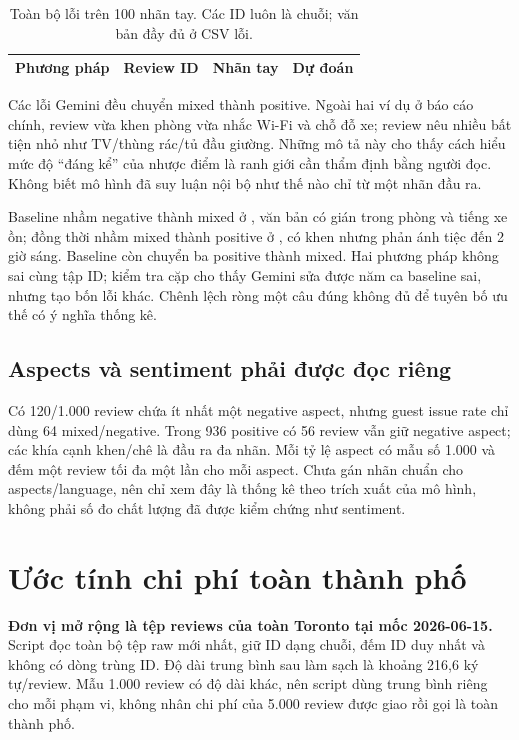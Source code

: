 \documentclass[11pt,a4paper]{article}
\begin{document}
\begin{table}[htbp]\centering\small
\caption{Toàn bộ lỗi trên 100 nhãn tay. Các ID luôn là chuỗi; văn bản đầy đủ ở CSV lỗi.}
\begin{tabular}{@{}lp{4.7cm}ll@{}}\toprule
Phương pháp & Review ID & Nhãn tay & Dự đoán\\\midrule

\end{tabular}
\end{table}

\begin{sloppypar}
Các lỗi Gemini đều chuyển mixed thành positive. Ngoài hai ví dụ ở báo cáo chính, review  vừa khen phòng vừa nhắc Wi-Fi và chỗ đỗ xe; review  nêu nhiều bất tiện nhỏ như TV/thùng rác/tủ đầu giường. Những mô tả này cho thấy cách hiểu mức độ ``đáng kể'' của nhược điểm là ranh giới cần thẩm định bằng người đọc. Không biết mô hình đã suy luận nội bộ như thế nào chỉ từ một nhãn đầu ra.
\end{sloppypar}

Baseline nhầm negative thành mixed ở , văn bản có gián trong phòng và tiếng xe ồn; đồng thời nhầm mixed thành positive ở , có khen nhưng phản ánh tiệc đến 2 giờ sáng. Baseline còn chuyển ba positive thành mixed. Hai phương pháp không sai cùng tập ID; kiểm tra cặp cho thấy Gemini sửa được năm ca baseline sai, nhưng tạo bốn lỗi khác. Chênh lệch ròng một câu đúng không đủ để tuyên bố ưu thế có ý nghĩa thống kê.

\subsection{Aspects và sentiment phải được đọc riêng}
Có 120/1.000 review chứa ít nhất một negative aspect, nhưng guest issue rate chỉ dùng 64 mixed/negative. Trong 936 positive có 56 review vẫn giữ negative aspect; các khía cạnh khen/chê là đầu ra đa nhãn. Mỗi tỷ lệ aspect có mẫu số 1.000 và đếm một review tối đa một lần cho mỗi aspect. Chưa gán nhãn chuẩn cho aspects/language, nên chỉ xem đây là thống kê theo trích xuất của mô hình, không phải số đo chất lượng đã được kiểm chứng như sentiment.

\clearpage
\section{Ước tính chi phí toàn thành phố}
\textbf{Đơn vị mở rộng là tệp reviews của toàn Toronto tại mốc 2026-06-15.} Script đọc toàn bộ tệp raw mới nhất, giữ ID dạng chuỗi, đếm \CityReviewCount{} ID duy nhất và không có dòng trùng ID. Độ dài trung bình sau làm sạch là khoảng 216,6 ký tự/review. Mẫu 1.000 review có độ dài khác, nên script dùng trung bình riêng cho mỗi phạm vi, không nhân chi phí của 5.000 review được giao rồi gọi là toàn thành phố.
\end{document}
